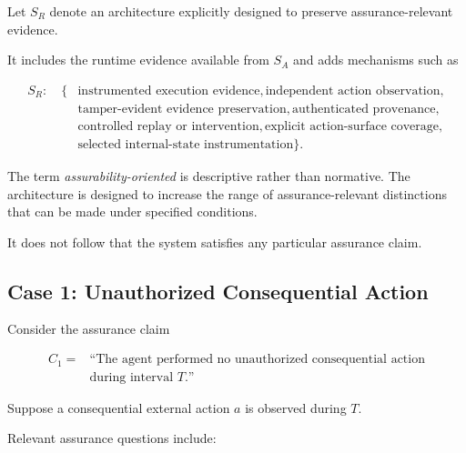 Let \(S_R\) denote an architecture explicitly designed to preserve
assurance-relevant evidence.

It includes the runtime evidence available from \(S_A\) and adds
mechanisms such as

\begin{equation}
  \begin{aligned}
    S_R:\quad \{ &
    \text{instrumented execution evidence},
    \text{independent action observation},   \\
                 &
    \text{tamper-evident evidence preservation},
    \text{authenticated provenance},         \\
                 &
    \text{controlled replay or intervention},
    \text{explicit action-surface coverage}, \\
                 &
    \text{selected internal-state instrumentation}
    \}.
  \end{aligned}
\end{equation}

The term \emph{assurability-oriented} is descriptive rather than normative.
The architecture is designed to increase the range of assurance-relevant
distinctions that can be made under specified conditions.

It does not follow that the system satisfies any particular assurance claim.

\subsection{Case 1: Unauthorized Consequential Action}
\label{aa.subsec.case-unauthorized-action}

Consider the assurance claim

\begin{equation}
  \begin{aligned}
    C_1 ={} & \text{``The agent performed no unauthorized consequential action} \\
            & \text{during interval }T\text{.''}
  \end{aligned}
  \label{eq:claim-unauthorized-action}
\end{equation}

Suppose a consequential external action \(a\) is observed during \(T\).

Relevant assurance questions include:

